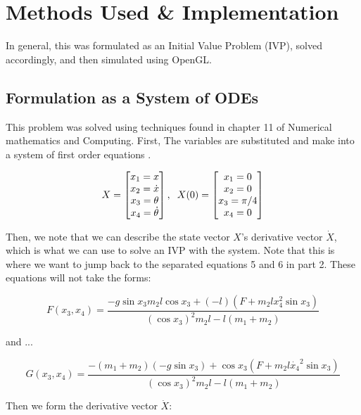 \documentclass[12pt]{article}
\begin{document}
\section{Methods Used \& Implementation}

In general, this was formulated as an Initial Value Problem (IVP), solved accordingly,
and then simulated using OpenGL.

\subsection{Formulation as a System of ODEs}

This problem was solved using techniques found in chapter 11 of Numerical mathematics
and Computing. First, The variables are substituted and make into a system of first
order equations \cite{classbook}.

\[
X =
\begin{bmatrix}
  x_1 = x \\
  x_2 = \dot{x} \\
  x_3 = \theta \\
  x_4 = \dot{\theta}
\end{bmatrix}
,
\hspace{2mm}
X(0) =
\begin{bmatrix}
  x_1 = 0 \\
  x_2 = 0 \\
  x_3 = \pi / 4 \\
  x_4 = 0
\end{bmatrix}
\]

Then, we note that we can describe the state vector $X$'s derivative vector $\dot{X}$,
which is what we can use to solve an IVP with the system. Note that this is where we want
to jump back to the separated equations 5 and 6 in part 2. These equations will not take the forms:

\begin{equation} \label{eq:7}
F(x_3, x_4) = \frac{-g \sin x_3 m_2 l \cos x_3 + (-l)(F + m_2 l x_4^2 \sin x_3) }{ (\cos x_3)^2 m_2 l - l(m_1 + m_2) }
\end{equation}

and ...

\begin{equation} \label{eq:8}
G(x_3, x_4) = \frac{-(m_1 + m_2)(-g \sin x_3) + \cos x_3 (F + m_2 l \dot{x_4}^2 \sin x_3) }{ (\cos x_3)^2 m_2 l - l(m_1 + m_2) }
\end{equation}

Then we form the derivative vector $\dot{X}$:
\end{document}
